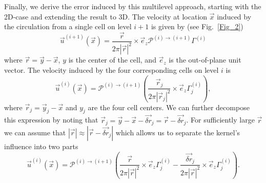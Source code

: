 \documentclass[preprint,12pt]{elsarticle}
\begin{document}
Finally, we derive the error induced by this multilevel approach, starting with the 2D-case and extending the result to 3D. The velocity at location $\vec x$ induced by the circulation from a single cell on level $i+1$ is given by (see Fig.~\ref{Fig_2})
\begin{equation}\label{eq:induced_1}
    \vec{u}^{(i+1)}(\vec{x}) = \frac{\vec{r}}{2\pi|\vec{r}|^2}\times\vec{e}_z\mathcal{P}^{(i)\to(i+1)}\Gamma^{(i)}
\end{equation}
where $\vec{r}=\vec{y}-\vec{x}$, $y$ is the center of the cell, and $\vec{e}_z$ is the out-of-plane unit vector. The velocity induced by the four corresponding cells on level $i$ is
\begin{equation}
    \vec{u}^{(i)}(\vec{x}) = \mathcal{P}^{(i)\to(i+1)}
    \left(\frac{\vec{r}_j}{2\pi|\vec{r}_j|^2}\times\vec{e}_z\Gamma^{(i)}_j\right),
\end{equation}
where $\vec{r}_j=\vec{y}_j-\vec{x}$ and $y_j$ are the four cell centers. We can further decompose this expression by noting that $\vec{r}_j=\vec{y}-\vec{x}-\vec{\delta r}_j=\vec{r}-\vec{\delta r}_j$.
For sufficiently large $\vec{r}$ we can assume that $|\vec{r}|\approx|\vec{r}-\vec{\delta r}_j|$ %
which allows us to separate the kernel's influence into two parts
\begin{equation}
    \vec{u}^{(i)}(\vec{x}) = \mathcal{P}^{(i)\to(i+1)}    \left(\frac{\vec{r}}{2\pi|\vec{r}|^2}\times\vec{e}_z\Gamma^{(i)}_j-\frac{\vec{\delta r}_j}{2\pi|\vec{r}|^2}\times\vec{e}_z\Gamma^{(i)}_j\right).
\end{equation}
\end{document}
